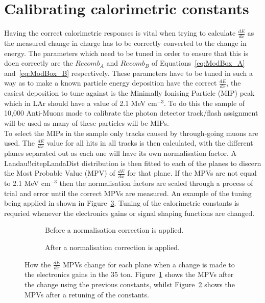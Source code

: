 \section{Calibrating calorimetric constants}  %
Having the correct calorimetric responses is vital when trying to calculate $\frac{dE}{dx}$ as the measured change in charge has to be correctly converted to the change in energy. The parameters which need to be tuned in order to ensure that this is doen correctly are the $Recomb_A$ and $Recomb_B$ of Equations~\ref{eq:ModBox_A} and~\ref{eq:ModBox_B} respectively. These parameters have to be tuned in such a way as to make a known particle energy deposition have the correct $\frac{dE}{dx}$, the easiest deposition to tune against is the Minimally Ionising Particle (MIP) peak which in LAr should have a value of 2.1 MeV cm$^{-3}$. To do this the sample of 10,000 Anti-Muons made to calibrate the photon detector track/flash assignment will be used as many of these particles will be MIPs. \\

To select the MIPs in the sample only tracks caused by through-going muons are used. The $\frac{dE}{dx}$ value for all hits in all tracks is then calculated, with the different planes separated out as each one will have its own normalisation factor. A Landau!!citep{LandaDist} distribution is then fitted to each of the planes to discern the Most Probable Value (MPV) of $\frac{dE}{dx}$ for that plane. If the MPVs are not equal to 2.1 MeV cm$^{-3}$ then the normalisation factors are scaled through a process of trial and error until the correct MPVs are measured. An example of the tuning being applied in shown in Figure~\ref{fig:CaloTune}. Tuning of the calorimetric constants is requried whenever the electronics gains or signal shaping functions are changed.

\begin{figure}[h!]
  \centering
  \begin{subfigure}{0.45\textwidth}
    \centering
    \caption{Before a normalisation correction is applied.}
    \label{fig:CaloTune_Before}
  \end{subfigure}
  \hspace{0.08\textwidth}
  \begin{subfigure}{0.45\textwidth}
    \centering
    \caption{After a normalisation correction is applied.}
    \label{fig:CaloTune_After}
  \end{subfigure}
  \caption[The tuning of the calorimetric constants in the 35 ton]
          {How the $\frac{dE}{dx}$ MPVs change for each plane when a change is made to the electronics gains in the 35 ton. Figure~\ref{fig:CaloTune_Before} shows the MPVs after the change using the previous constants, whilst Figure~\ref{fig:CaloTune_After} shows the MPVs after a retuning of the constants.}
          \label{fig:CaloTune}
\end{figure}
        

